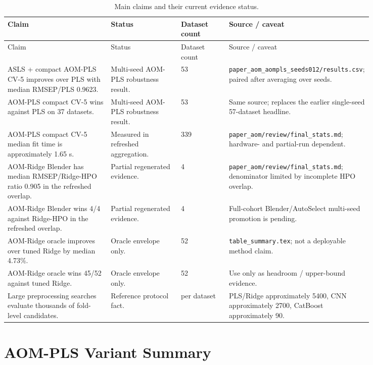\documentclass[11pt,a4paper]{article}
\newcommand{\code}[1]{\nolinkurl{#1}}
\begin{document}
\begin{longtable}{L{0.29\linewidth}L{0.19\linewidth}L{0.13\linewidth}L{0.23\linewidth}}
\caption{Main claims and their current evidence status.}\\
\toprule
Claim & Status & Dataset count & Source / caveat \\
\midrule
\endfirsthead
\toprule
Claim & Status & Dataset count & Source / caveat \\
\midrule
\endhead
ASLS + compact AOM-PLS CV-5 improves over PLS with median RMSEP/PLS 0.9623. &
Multi-seed AOM-PLS robustness result. & 53 &
\code{paper_aom_aompls_seeds012/results.csv}; paired after averaging over seeds.\\
AOM-PLS compact CV-5 wins against PLS on 37 datasets. &
Multi-seed AOM-PLS robustness result. & 53 &
Same source; replaces the earlier single-seed 57-dataset headline.\\
AOM-PLS compact CV-5 median fit time is approximately 1.65 s. &
Measured in refreshed aggregation. & 339 &
\code{paper_aom/review/final_stats.md}; hardware- and partial-run dependent.\\
AOM-Ridge Blender has median RMSEP/Ridge-HPO ratio 0.905 in the refreshed overlap. &
Partial regenerated evidence. & 4 &
\code{paper_aom/review/final_stats.md}; denominator limited by incomplete HPO overlap.\\
AOM-Ridge Blender wins 4/4 against Ridge-HPO in the refreshed overlap. &
Partial regenerated evidence. & 4 &
Full-cohort Blender/AutoSelect multi-seed promotion is pending.\\
AOM-Ridge oracle improves over tuned Ridge by median 4.73\%. &
Oracle envelope only. & 52 &
\code{table_summary.tex}; not a deployable method claim.\\
AOM-Ridge oracle wins 45/52 against tuned Ridge. &
Oracle envelope only. & 52 &
Use only as headroom / upper-bound evidence.\\
Large preprocessing searches evaluate thousands of fold-level candidates. &
Reference protocol fact. & per dataset &
PLS/Ridge approximately 5400, CNN approximately 2700, CatBoost approximately 90.\\
\bottomrule
\end{longtable}

\section{AOM-PLS Variant Summary}
\end{document}
